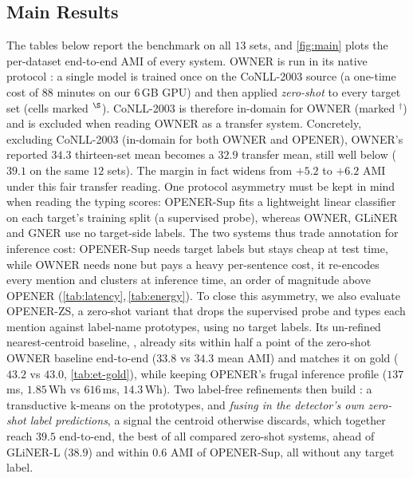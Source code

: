 \subsection{Main Results}
\label{sec:exp:results}
The tables below report the benchmark on all $13$ sets, and \autoref{fig:main} plots the per-dataset end-to-end AMI of every system.
OWNER is run in its native protocol \cite{genest2025owner}: a single model is trained once on the CoNLL-2003 source (a one-time cost of $88$ minutes on our 6\,GB GPU) and then applied \emph{zero-shot} to every target set (cells marked $^\S$).
CoNLL-2003 is therefore in-domain for OWNER (marked $^\dagger$) and is excluded when reading OWNER as a transfer system.
Concretely, excluding CoNLL-2003 (in-domain for both OWNER and OPENER), OWNER's reported $34.3$ thirteen-set mean becomes a $32.9$ transfer mean, still well below \zstr ($39.1$ on the same $12$ sets). The margin in fact widens from $+5.2$ to $+6.2$ AMI under this fair transfer reading.
One protocol asymmetry must be kept in mind when reading the typing scores: OPENER-Sup fits a lightweight linear classifier on each target's training split (a supervised probe), whereas OWNER, GLiNER and GNER use no target-side labels.
The two systems thus trade annotation for inference cost: OPENER-Sup needs target labels but stays cheap at test time, while OWNER needs none but pays a heavy per-sentence cost, it re-encodes every mention and clusters at inference time, an order of magnitude above OPENER (\autoref{tab:latency},\,\autoref{tab:energy}).
To close this asymmetry, we also evaluate OPENER-ZS, a zero-shot variant that drops the supervised probe and types each mention against label-name prototypes, using no target labels.
Its un-refined nearest-centroid baseline, \zsind, already sits within half a point of the zero-shot OWNER baseline end-to-end ($33.8$ vs $34.3$ mean AMI) and matches it on gold ($43.2$ vs $43.0$, \autoref{tab:et-gold}), while keeping OPENER's frugal inference profile ($137$\,ms, $1.85$\,Wh vs $616$\,ms, $14.3$\,Wh).
Two label-free refinements then build \zstr: a transductive k-means on the prototypes, and \emph{fusing in the detector's own zero-shot label predictions}, a signal the centroid otherwise discards, which together reach $39.5$ end-to-end, the best of all compared zero-shot systems, ahead of GLiNER-L ($38.9$) and within $0.6$ AMI of OPENER-Sup, all without any target label.
